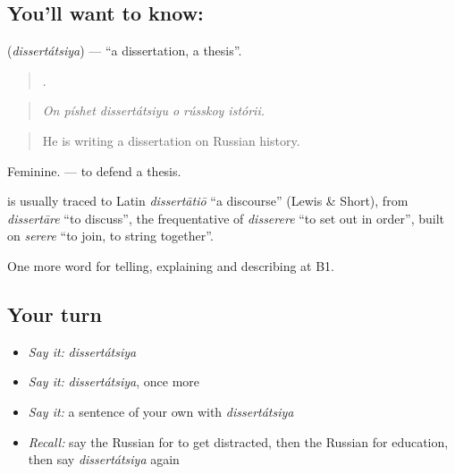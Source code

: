 \subsection*{You'll want to know: }
\textbf{} (\emph{dissertátsiya}) — \textquotedblleft{}a dissertation, a thesis\textquotedblright{}.

\begin{quote}
     .
\end{quote}

\begin{quote}
\emph{On píshet dissertátsiyu o rússkoy istórii.}
\end{quote}

\begin{quote}
He is writing a dissertation on Russian history.
\end{quote}

Feminine. \emph{ } — to defend a thesis.

\begin{cousinweb}
\textbf{} is usually traced to Latin \emph{dissertātiō} \textquotedblleft{}a discourse\textquotedblright{} (Lewis \& Short), from \emph{dissertāre} \textquotedblleft{}to discuss\textquotedblright{}, the frequentative of \emph{disserere} \textquotedblleft{}to set out in order\textquotedblright{}, built on \emph{serere} \textquotedblleft{}to join, to string together\textquotedblright{}.
\end{cousinweb}

\begin{grammarlens}[title={What you've built}]
One more word for telling, explaining and describing at B1.
\end{grammarlens}

\subsection*{Your turn}
\begin{itemize}
\raggedright
  \item \emph{Say it:} \emph{dissertátsiya}
  \item \emph{Say it:} \emph{dissertátsiya}, once more
  \item \emph{Say it:} a sentence of your own with \emph{dissertátsiya}
  \item \emph{Recall:} say the Russian for to get distracted, then the Russian for education, then say \emph{dissertátsiya} again
\end{itemize}

